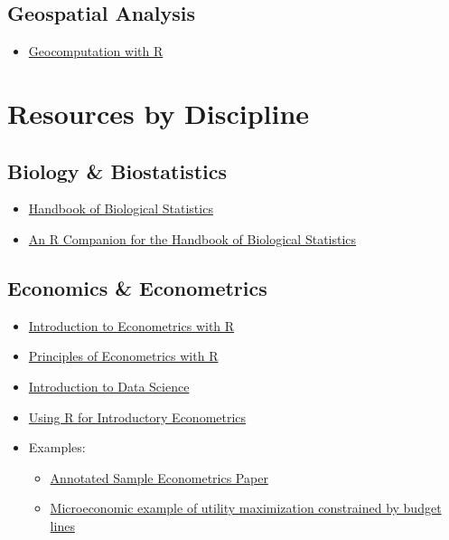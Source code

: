 \documentclass[]{book}
\providecommand{\tightlist}{%
  \setlength{\itemsep}{0pt}\setlength{\parskip}{0pt}}
\begin{document}
\hypertarget{geospatial-analysis}{%
\section{Geospatial Analysis}\label{geospatial-analysis}}

\begin{itemize}
\tightlist
\item
  \href{https://geocompr.robinlovelace.net/}{Geocomputation with R}
\end{itemize}

\hypertarget{resources-by-discipline}{%
\chapter*{Resources by Discipline}\label{resources-by-discipline}}

\hypertarget{biology-biostatistics}{%
\section*{Biology \& Biostatistics}\label{biology-biostatistics}}

\begin{itemize}
\tightlist
\item
  \href{http://www.biostathandbook.com/}{Handbook of Biological Statistics}
\item
  \href{https://rcompanion.org/rcompanion/index.html}{An R Companion for the Handbook of Biological Statistics}
\end{itemize}

\hypertarget{economics-econometrics}{%
\section*{Economics \& Econometrics}\label{economics-econometrics}}

\begin{itemize}
\item
  \href{https://www.econometrics-with-r.org}{Introduction to Econometrics with R}
\item
  \href{https://bookdown.org/ccolonescu/RPoE4/}{Principles of Econometrics with R}
\item
  \href{https://bookdown.org/ronsarafian/IntrotoDS/}{Introduction to Data Science}
\item
  \href{http://www.urfie.net/read.html}{Using R for Introductory Econometrics}
\item
  Examples:

  \begin{itemize}
  \item
    \href{https://minerva.union.edu/dvorakt/43/sample_paper.htm}{Annotated Sample Econometrics Paper}
  \item
    \href{https://www.andrewheiss.com/blog/2019/02/16/algebra-calculus-r-yacas/}{Microeconomic example of utility maximization constrained by budget lines}
  \end{itemize}
\end{itemize}
\end{document}
